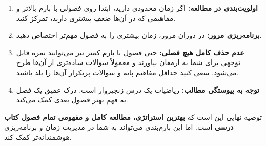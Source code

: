 \documentclass[12pt,a4paper]{article}
\begin{document}
\begin{enumerate}
    \item \textbf{اولویت‌بندی در مطالعه:} اگر زمان محدودی دارید، ابتدا روی فصولی با بارم بالاتر و مفاهیمی که در آن‌ها ضعف بیشتری دارید، تمرکز کنید.
    \item \textbf{برنامه‌ریزی مرور:} در دوران مرور، زمان بیشتری را به فصول مهم‌تر اختصاص دهید.
    \item \textbf{عدم حذف کامل هیچ فصلی:} حتی فصول با بارم کمتر نیز می‌توانند نمره قابل توجهی برای شما به ارمغان بیاورند و معمولاً سوالات ساده‌تری از آن‌ها طرح می‌شود. سعی کنید حداقل مفاهیم پایه و سوالات پرتکرار آن‌ها را بلد باشید.
    \item \textbf{توجه به پیوستگی مطالب:} ریاضیات یک درس زنجیروار است. درک عمیق یک فصل به فهم بهتر فصول بعدی کمک می‌کند.
\end{enumerate}

توصیه نهایی این است که \textbf{بهترین استراتژی، مطالعه کامل و مفهومی تمام فصول کتاب درسی} است. اما این بارم‌بندی می‌تواند به شما در مدیریت زمان و برنامه‌ریزی هوشمندانه‌تر کمک کند.
\end{document}
